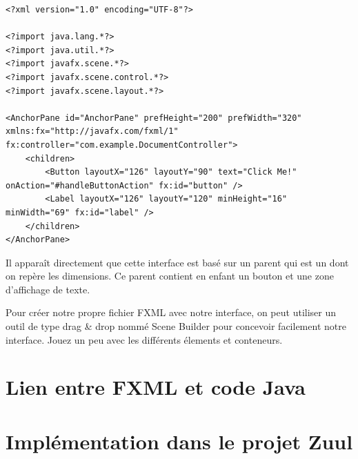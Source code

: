 \begin{appendix}
\begin{codeblock}
\begin{verbatim}
<?xml version="1.0" encoding="UTF-8"?>

<?import java.lang.*?>
<?import java.util.*?>
<?import javafx.scene.*?>
<?import javafx.scene.control.*?>
<?import javafx.scene.layout.*?>

<AnchorPane id="AnchorPane" prefHeight="200" prefWidth="320" xmlns:fx="http://javafx.com/fxml/1" fx:controller="com.example.DocumentController">
    <children>
        <Button layoutX="126" layoutY="90" text="Click Me!" onAction="#handleButtonAction" fx:id="button" />
        <Label layoutX="126" layoutY="120" minHeight="16" minWidth="69" fx:id="label" />
    </children>
</AnchorPane>
\end{verbatim}
\end{codeblock}

Il apparaît directement que cette interface est basé sur un parent qui est un  dont on repère les dimensions. Ce parent contient en enfant un bouton et une zone d'affichage de texte.

Pour créer notre propre fichier FXML avec notre interface, on peut utiliser un outil de type drag \& drop nommé Scene Builder pour concevoir facilement notre interface. Jouez un peu avec les différents élements et conteneurs.

\section{Lien entre FXML et code Java}

\section{Implémentation dans le projet Zuul}

\end{appendix}
